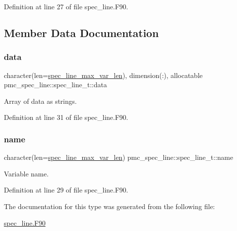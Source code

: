 Definition at line 27 of file spec\+\_\+line.\+F90.



\subsection{Member Data Documentation}
\mbox{\label{structpmc__spec__line_1_1spec__line__t_a9093e9ada6cefc71ebc9ce157ef15ca2}} 
\subsubsection{\texorpdfstring{data}{data}}
{\footnotesize\ttfamily character(len=\mbox{\hyperlink{namespacepmc__spec__line_a54f3958fcd2d7924fc1b9659e5442876}{spec\+\_\+line\+\_\+max\+\_\+var\+\_\+len}}), dimension(\+:), allocatable pmc\+\_\+spec\+\_\+line\+::spec\+\_\+line\+\_\+t\+::data}



Array of data as strings. 



Definition at line 31 of file spec\+\_\+line.\+F90.

\mbox{\label{structpmc__spec__line_1_1spec__line__t_a2c3228d54fb1fa9f8dba3bce96b0952b}} 
\subsubsection{\texorpdfstring{name}{name}}
{\footnotesize\ttfamily character(len=\mbox{\hyperlink{namespacepmc__spec__line_a54f3958fcd2d7924fc1b9659e5442876}{spec\+\_\+line\+\_\+max\+\_\+var\+\_\+len}}) pmc\+\_\+spec\+\_\+line\+::spec\+\_\+line\+\_\+t\+::name}



Variable name. 



Definition at line 29 of file spec\+\_\+line.\+F90.



The documentation for this type was generated from the following file\+:\begin{DoxyCompactItemize}
\item 
\mbox{\hyperlink{spec__line_8_f90}{spec\+\_\+line.\+F90}}\end{DoxyCompactItemize}
